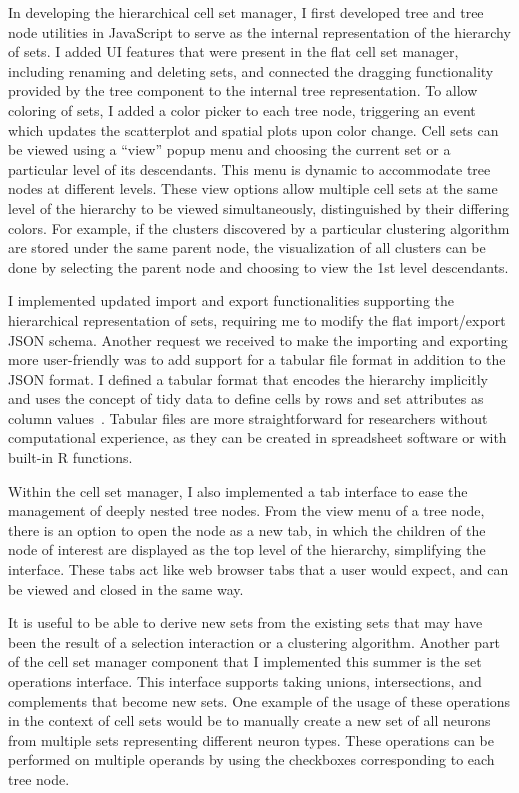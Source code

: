 \documentclass[12pt, letterpaper]{article}
\begin{document}
In developing the hierarchical cell set manager, I first developed tree and tree node utilities in JavaScript to serve as the internal representation of the hierarchy of sets.
I added UI features that were present in the flat cell set manager, including renaming and deleting sets, and connected the dragging functionality provided by the tree component to the internal tree representation.
To allow coloring of sets, I added a color picker to each tree node, triggering an event which updates the scatterplot and spatial plots upon color change.
Cell sets can be viewed using a ``view'' popup menu and choosing the current set or a particular level of its descendants.
This menu is dynamic to accommodate tree nodes at different levels.
These view options allow multiple cell sets at the same level of the hierarchy to be viewed simultaneously, distinguished by their differing colors.
For example, if the clusters discovered by a particular clustering algorithm are stored under the same parent node, the visualization of all clusters can be done by selecting the parent node and choosing to view the 1st level descendants.

I implemented updated import and export functionalities supporting the hierarchical representation of sets, requiring me to modify the flat import/export JSON schema.
Another request we received to make the importing and exporting more user-friendly was to add support for a tabular file format in addition to the JSON format.
I defined a tabular format that encodes the hierarchy implicitly and uses the concept of tidy data to define cells by rows and set attributes as column values~\cite{wickham2014tidy}.
Tabular files are more straightforward for researchers without computational experience, as they can be created in spreadsheet software or with built-in R functions.

Within the cell set manager, I also implemented a tab interface to ease the management of deeply nested tree nodes.
From the view menu of a tree node, there is an option to open the node as a new tab, in which the children of the node of interest are displayed as the top level of the hierarchy, simplifying the interface.
These tabs act like web browser tabs that a user would expect, and can be viewed and closed in the same way.

It is useful to be able to derive new sets from the existing sets that may have been the result of a selection interaction or a clustering algorithm.
Another part of the cell set manager component that I implemented this summer is the set operations interface.
This interface supports taking unions, intersections, and complements that become new sets.
One example of the usage of these operations in the context of cell sets would be to manually create a new set of all neurons from multiple sets representing different neuron types.
These operations can be performed on multiple operands by using the checkboxes corresponding to each tree node.
\end{document}
